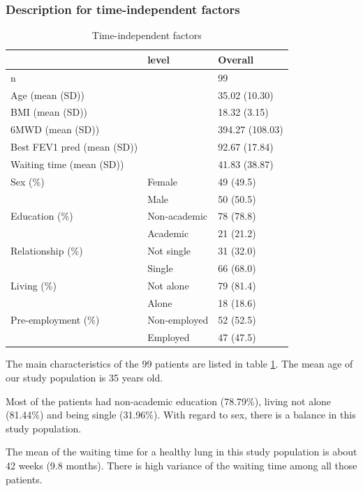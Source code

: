 \documentclass[11pt, a4paper]{article}\usepackage[]{graphicx}\usepackage[]{color}
\begin{document}
\subsubsection*{Description for time-independent factors}\label{subsubsec:time_ind}
\begin{table}[ht]
\centering

\begin{tabular}{lll}
\toprule
  & level & Overall\\
\midrule
n &  & 99\\
Age (mean (SD)) &  & 35.02 (10.30)\\
BMI (mean (SD)) &  & 18.32 (3.15)\\
6MWD (mean (SD)) &  & 394.27 (108.03)\\
Best FEV1 pred (mean (SD)) &  & 92.67 (17.84)\\
\addlinespace
Waiting time (mean (SD)) &  & 41.83 (38.87)\\
Sex (\%) & Female & 49 (49.5)\\
 & Male & 50 (50.5)\\
Education (\%) & Non-academic & 78 (78.8)\\
 & Academic & 21 (21.2)\\
\addlinespace
Relationship (\%) & Not single & 31 (32.0)\\
 & Single & 66 (68.0)\\
Living (\%) & Not alone & 79 (81.4)\\
 & Alone & 18 (18.6)\\
Pre-employment (\%) & Non-employed & 52 (52.5)\\
\addlinespace
 & Employed & 47 (47.5)\\
\bottomrule
\end{tabular}


\caption{Time-independent factors}\label{tab:tab1}
\end{table}

The main characteristics of the 99 patients are listed in table \ref{tab:tab1}. The mean age of our study population is 35 years old. 

Most of the patients had non-academic education 
(78.79\%), 
living not alone 
(81.44\%) 
and being single 
(31.96\%). With regard to sex, there is a balance in this study population. 

The mean of the waiting time for a healthy lung in this study population is about 
42 weeks 
(9.8 months). There is high variance of the waiting time among all those patients.
\end{document}
